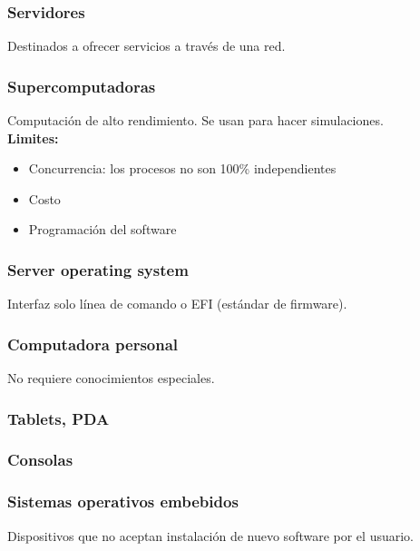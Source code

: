 \documentclass[a4paper, twoside]{article}
\begin{document}
\subsubsection{Servidores}

Destinados a ofrecer servicios a través de una red.

\subsubsection{Supercomputadoras}

Computación de alto rendimiento. Se usan para hacer simulaciones.\\

\textbf{Limites:}

\begin{itemize}
  \item Concurrencia: los procesos no son 100\% independientes
  \item Costo
  \item Programación del software
\end{itemize}

\subsubsection{Server operating system}

Interfaz solo línea de comando o EFI (estándar de firmware).

\subsubsection{Computadora personal}

No requiere conocimientos especiales.

\subsubsection{Tablets, PDA}

\subsubsection{Consolas}

\subsubsection{Sistemas operativos embebidos}

Dispositivos que no aceptan instalación de nuevo software por el usuario.
\end{document}
